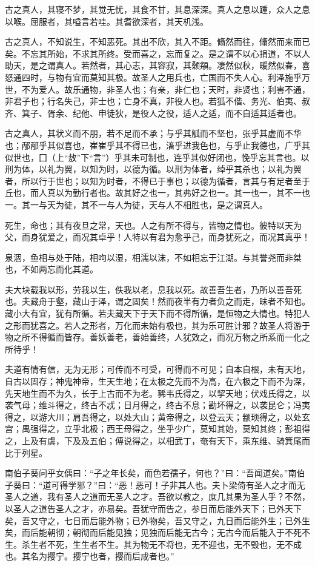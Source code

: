 \documentclass[]{article}
\begin{document}
古之真人，其寝不梦，其觉无忧，其食不甘，其息深深。真人之息以踵，众人之息以喉。屈服者，其嗌言若哇。其耆欲深者，其天机浅。

古之真人，不知说生，不知恶死。其出不欣，其入不距。翛然而往，翛然而来而已矣。不忘其所始，不求其所终。受而喜之，忘而复之。是之谓不以心捐道，不以人助天，是之谓真人。若然者，其心志，其容寂，其颡頯。凄然似秋，暖然似春，喜怒通四时，与物有宜而莫知其极。故圣人之用兵也，亡国而不失人心。利泽施乎万世，不为爱人。故乐通物，非圣人也；有亲，非仁也；天时，非贤也；利害不通，非君子也；行名失己，非士也；亡身不真，非役人也。若狐不偕、务光、伯夷、叔齐、箕子、胥余、纪他、申徒狄，是役人之役，适人之适，而不自适其适者也。

古之真人，其状义而不朋，若不足而不承；与乎其觚而不坚也，张乎其虚而不华也；邴邴乎其似喜也，崔崔乎其不得已也，滀乎进我色也，与乎止我德也，广乎其似世也，囗（上``敖''下``言''）乎其未可制也，连乎其似好闭也，悗乎忘其言也。以刑为体，以礼为翼，以知为时，以德为循。以刑为体者，绰乎其杀也；以礼为翼者，所以行于世也；以知为时者，不得已于事也；以德为循者，言其与有足者至于丘也，而人真以为勤行者也。故其好之也一，其弗好之也一。其一也一，其不一也一。其一与天为徒，其不一与人为徒，天与人不相胜也，是之谓真人。

死生，命也；其有夜旦之常，天也。人之有所不得与，皆物之情也。彼特以天为父，而身犹爱之，而况其卓乎！人特以有君为愈乎己，而身犹死之，而况其真乎！

泉涸，鱼相与处于陆，相呴以湿，相濡以沫，不如相忘于江湖。与其誉尧而非桀也，不如两忘而化其道。

夫大块载我以形，劳我以生，佚我以老，息我以死。故善吾生者，乃所以善吾死也。夫藏舟于壑，藏山于泽，谓之固矣！然而夜半有力者负之而走，昧者不知也。藏小大有宜，犹有所循。若夫藏天下于天下而不得所循，是恒物之大情也。特犯人之形而犹喜之。若人之形者，万化而未始有极也，其为乐可胜计邪？故圣人将游于物之所不得循而皆存。善妖善老，善始善终，人犹效之，而况万物之所系而一化之所待乎！

夫道有情有信，无为无形；可传而不可受，可得而不可见；自本自根，未有天地，自古以固存；神鬼神帝，生天生地；在太极之先而不为高，在六极之下而不为深，先天地生而不为久，长于上古而不为老。豨韦氏得之，以挈天地；伏戏氏得之，以袭气母；维斗得之，终古不忒；日月得之，终古不息；勘坏得之，以袭昆仑；冯夷得之，以游大川；肩吾得之，以处大山；黄帝得之，以登云天；颛顼得之，以处玄宫；禺强得之，立乎北极；西王母得之，坐乎少广，莫知其始，莫知其终；彭祖得之，上及有虞，下及及五伯；傅说得之，以相武丁，奄有天下，乘东维、骑箕尾而比于列星。

南伯子葵问乎女偊曰：``子之年长矣，而色若孺子，何也？''曰：``吾闻道矣。''南伯子葵曰：``道可得学邪？''曰：``恶！恶可！子非其人也。夫卜梁倚有圣人之才而无圣人之道，我有圣人之道而无圣人之才。吾欲以教之，庶几其果为圣人乎？不然，以圣人之道告圣人之才，亦易矣。吾犹守而告之，参日而后能外天下；已外天下矣，吾又守之，七日而后能外物；已外物矣，吾又守之，九日而后能外生；已外生矣，而后能朝彻；朝彻而后能见独；见独而后能无古今；无古今而后能入于不死不生。杀生者不死，生生者不生。其为物无不将也，无不迎也，无不毁也，无不成也。其名为撄宁。撄宁也者，撄而后成者也。''
\end{document}
